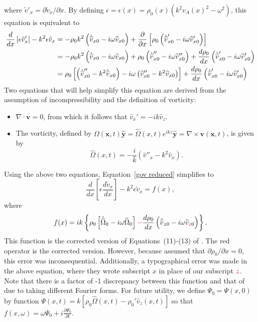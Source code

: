 where $\tilde{v}'_x = \partial\tilde{v}_x/\partial x$. By defining $\epsilon = \epsilon(x) = \rho_0(x)(k^2v_A(x)^2 - \omega^2)$, this equation is equivalent to
\begin{align}
\frac{d}{dx} \left[\epsilon \tilde{v}_x'\right] - k^2\epsilon \tilde{v}_x & = - \rho_0 k^2\left(\dot{\widehat{v}}_{x0} - i\omega\widehat{v}_{x0}\right) + \frac{\partial}{\partial x}\left[\rho_0\left(\dot{\widehat{v}}_{x0}' - i\omega\widehat{v}_{x0}'\right)\right] \notag \\
& = - \rho_0 k^2\left(\dot{\widehat{v}}_{x0} - i\omega\widehat{v}_{x0}\right) + \rho_0\left(\dot{\widehat{v}}_{x0}'' - i\omega\widehat{v}_{x0}''\right) + \frac{d\rho_0}{dx}\left(\dot{\widehat{v}}_{x0}' - i\omega\widehat{v}_{x0}'\right) \notag \\
& = \rho_0\left[\left(\dot{\widehat{v}}_{x0}'' - k^2\dot{\widehat{v}}_{x0}\right) - i\omega\left(\widehat{v}_{x0}'' - k^2\widehat{v}_{x0}\right)\right] + \frac{d\rho_0}{dx}\left(\dot{\widehat{v}}_{x0}' - i\omega\widehat{v}_{x0}'\right)
\label{gov reduced}
\end{align}
Two equations that will help simplify this equation are derived from the assumption of incompressibility and the definition of vorticity:
\begin{itemize}
	\item $\nabla\cdot\mathbf{v} = 0$, from which it follows that $\widehat{v}_x' = -ik \widehat{v}_z$.
	\item The vorticity, defined by $\Omega(\mathbf{x},t)\mathbf{\widehat{y}} = \widehat{\Omega}(x,t)e^{ikz}\mathbf{\widehat{y}} = \nabla \times \mathbf{v}(\mathbf{x},t)$, is given by	\begin{equation}
	\widehat{\Omega}(x,t) = -\frac{i}{k}\left(\widehat{v}''_x - k^2 \widehat{v}_x\right).
	\end{equation}
\end{itemize}
Using the above two equations, Equation~\eqref{gov reduced} simplifies to
\begin{equation}
\frac{d}{dx} \left[\epsilon \frac{d \tilde{v}_x}{d x}\right] - k^2\epsilon \tilde{v}_x = f(x), \label{gov}
\end{equation}
where
\begin{equation}f(x) = ik\left\{\rho_0\left[\dot{\widehat{\Omega}}_0 - i\omega\widehat{\Omega}_0\right] \textcolor{red}{-} \frac{d\rho_0}{dx}\left(\dot{\widehat{v}}_{z0} - i\omega\widehat{v}_{\textcolor{red}{z}0}\right)\right\}.
\end{equation}
This function is the corrected version of Equations~(11)-(13) of \cite{rae_etal81}. The red operator is the corrected version. However, because \cite{rae_etal81} assumed that $\partial \rho_0 / \partial x = 0$, this error was inconsequential. Additionally, a typographical error was made in the above equation, where they wrote subscript $x$ in place of our subscript $\textcolor{red}{z}$. Note that there is a factor of -1 discrepancy between this function and that of \cite{rae_etal81} due to taking different Fourier forms. For future utility, we define $\Psi_0 = \Psi(x, 0)$ by function $\Psi(x, t) = k[\rho_0\widehat{\Omega}(x, t) - \rho_0'\widehat{v}_z(x, t)]$ so that $f(x, \omega) = \omega \Psi_0 + i\frac{\partial \Psi_0}{\partial t}$.

